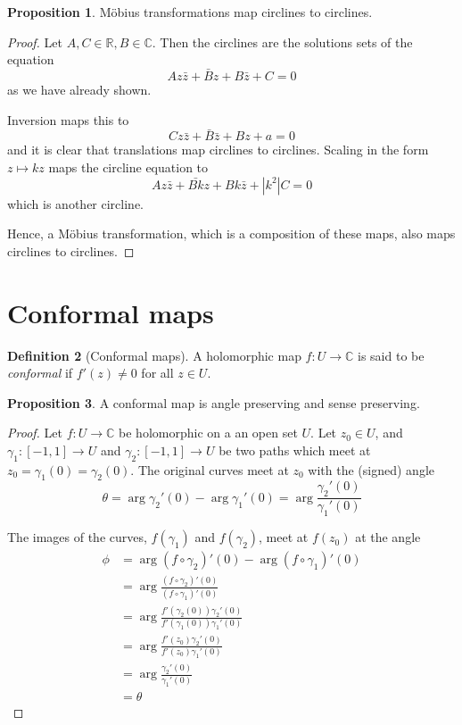 \documentclass[10pt,fleqn]{article}
\newcommand{\comps}{\mathbb{C}}
\newcommand{\reals}{\mathbb{R}}
\theoremstyle{definition} \newtheorem{defn}{Definition}[section]
\theoremstyle{plain}      \newtheorem{thm}[defn]{Theorem}
\theoremstyle{definition} \newtheorem{prop}[defn]{Proposition}
\theoremstyle{plain}      \newtheorem{lem}[defn]{Lemma}
\theoremstyle{definition} \newtheorem{cor}[defn]{Corollary}
\theoremstyle{definition} \newtheorem{ex}[defn]{Example}
\theoremstyle{definition} \newtheorem{rem}[defn]{Remark}
\begin{document}
\begin{prop}
    M\"obius transformations map circlines to circlines.
\end{prop}

\begin{proof}
    Let $A,C\in\reals,B\in\comps$.
    Then the circlines are the solutions sets of the equation
    \[
        Az\bar{z}+\bar{B}z+B\bar{z}+C=0
    \]
    as we have already shown.

    Inversion maps this to
    \[
        Cz\bar{z}+\bar{B}\bar{z}+Bz+a=0
    \]
    and it is clear that translations map circlines to circlines.
    Scaling in the form $z\mapsto kz$ maps the circline equation to
    \[
        Az\bar{z}+\bar{Bk}z+Bk\bar{z}+|k^2|C=0
    \]
    which is another circline.

    Hence, a M\"obius transformation, which is a composition of these maps, also maps circlines to circlines.
\end{proof}


\section{Conformal maps}

\begin{defn}[Conformal maps]
    A holomorphic map $f:U\to\comps$ is said to be \emph{conformal} if $f'(z)\neq0$ for all $z\in U$.
\end{defn}

\begin{prop}
    A conformal map is angle preserving and sense preserving.
\end{prop}

\begin{proof}
    Let $f:U\to\comps$ be holomorphic on a an open set $U$.
    Let $z_0\in U$, and $\gamma_1:[-1,1]\to U$ and $\gamma_2:[-1,1]\to U$ be two paths which meet at $z_0=\gamma_1(0)=\gamma_2(0)$.
    The original curves meet at $z_0$ with the (signed) angle
    \[
        \theta=
        \arg\gamma_2'(0)-\arg\gamma_1'(0)=
        \arg\frac{\gamma_2'(0)}{\gamma_1'(0)}
    \]

    The images of the curves, $f(\gamma_1)$ and $f(\gamma_2)$, meet at $f(z_0)$ at the angle
    \begin{align*}
        \phi
        &=
        \arg(f\circ\gamma_2)'(0)-\arg(f\circ\gamma_1)'(0)\\
        &=
        \arg\frac{(f\circ\gamma_2)'(0)}{(f\circ\gamma_1)'(0)}\\
        &=
        \arg\frac{f'(\gamma_2(0))\gamma_2'(0)}{f'(\gamma_1(0))\gamma_1'(0)}\\
        &=
        \arg\frac{f'(z_0)\gamma_2'(0)}{f'(z_0)\gamma_1'(0)}\\
        &=
        \arg\frac{\gamma_2'(0)}{\gamma_1'(0)}\\
        &=
        \theta
    \end{align*}
\end{proof}
\end{document}

